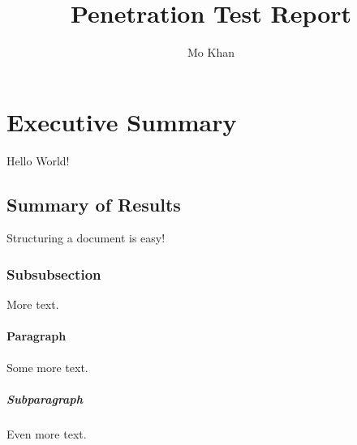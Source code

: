 \documentclass{article}
\title{Penetration Test Report}
\author{Mo Khan}
\begin{document}
\maketitle
\newpage
\tableofcontents
\newpage
{}

\section{Executive Summary}

Hello World!

\subsection{Summary of Results}

Structuring a document is easy!

\subsubsection{Subsubsection}

More text.

\paragraph{Paragraph}

Some more text.

\subparagraph{Subparagraph}

Even more text.

\end{document}
